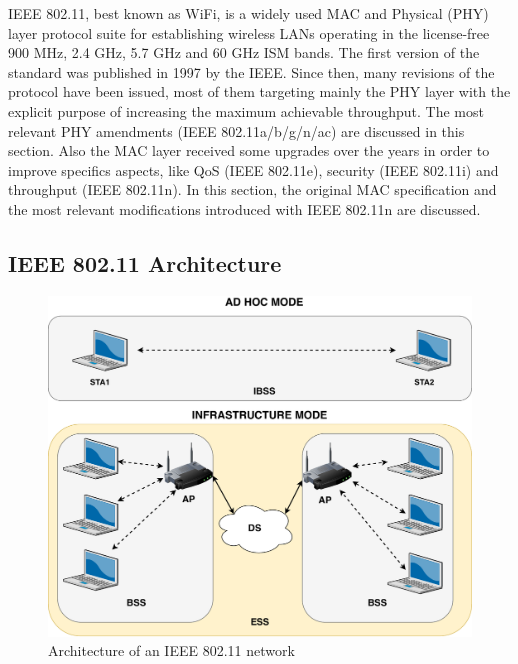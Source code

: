 \gls{IEEE} 802.11, best known as WiFi, is a widely used MAC and Physical (PHY) layer protocol suite for establishing wireless \glspl{LAN} operating in the license-free 900 MHz, 2.4 GHz, 5.7 GHz and 60 GHz \gls{ISM} bands. The first version of the standard was published in 1997 by the \gls{IEEE}. Since then, many revisions of the protocol have been issued, most of them targeting mainly the PHY layer with the explicit purpose of increasing the maximum achievable throughput. The most relevant PHY amendments (IEEE 802.11a/b/g/n/ac) are discussed in this section. Also the MAC layer received some upgrades over the years in order to improve specifics aspects, like QoS (IEEE 802.11e), security (IEEE 802.11i) and throughput (IEEE 802.11n). In this section, the original MAC specification and the most relevant modifications introduced with IEEE 802.11n are discussed.

\subsection{IEEE 802.11 Architecture}

\begin{figure}[h]
    \centering
    \includegraphics[width=1\textwidth]{images/wifi-architecture.pdf}
    \caption{Architecture of an IEEE 802.11 network}
    \label{fig:wifi-architecture}
\end{figure}

